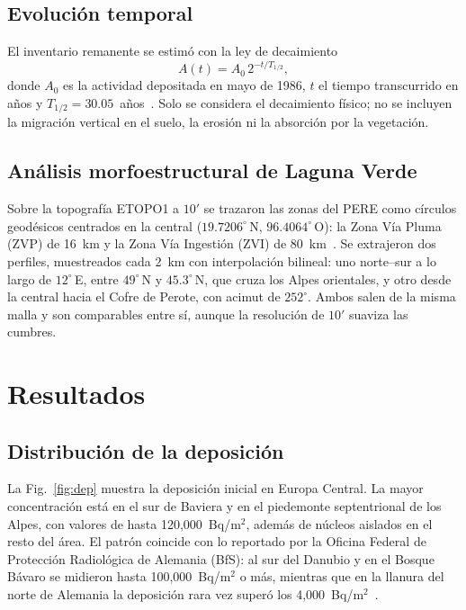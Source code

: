 \subsection{Evoluci\'on temporal}
El inventario remanente se estim\'o con la ley de decaimiento
\begin{equation}
A(t)=A_0\,2^{-t/T_{1/2}},
\label{eq:decay}
\end{equation}
donde $A_0$ es la actividad depositada en mayo de 1986, $t$ el tiempo transcurrido en a\~nos y $T_{1/2}=30.05$~a\~nos~\cite{pearce2008}. Solo se considera el decaimiento f\'isico; no se incluyen la migraci\'on vertical en el suelo, la erosi\'on ni la absorci\'on por la vegetaci\'on.

\subsection{An\'alisis morfoestructural de Laguna Verde}
Sobre la topograf\'ia ETOPO1 a $10'$ se trazaron las zonas del PERE como c\'irculos geod\'esicos centrados en la central ($19.7206^\circ$\,N, $96.4064^\circ$\,O): la Zona V\'ia Pluma (ZVP) de 16~km y la Zona V\'ia Ingesti\'on (ZVI) de 80~km~\cite{pere2011}. Se extrajeron dos perfiles, muestreados cada 2~km con interpolaci\'on bilineal: uno norte--sur a lo largo de $12^\circ$\,E, entre $49^\circ$\,N y $45.3^\circ$\,N, que cruza los Alpes orientales, y otro desde la central hacia el Cofre de Perote, con acimut de $252^\circ$. Ambos salen de la misma malla y son comparables entre s\'i, aunque la resoluci\'on de $10'$ suaviza las cumbres.

\section{Resultados}
\subsection{Distribuci\'on de la deposici\'on}
La Fig.~\ref{fig:dep} muestra la deposici\'on inicial en Europa Central. La mayor concentraci\'on est\'a en el sur de Baviera y en el piedemonte septentrional de los Alpes, con valores de hasta 120,000~Bq/m$^2$, adem\'as de n\'ucleos aislados en el resto del \'area. El patr\'on coincide con lo reportado por la Oficina Federal de Protecci\'on Radiol\'ogica de Alemania (BfS): al sur del Danubio y en el Bosque B\'avaro se midieron hasta 100,000~Bq/m$^2$ o m\'as, mientras que en la llanura del norte de Alemania la deposici\'on rara vez super\'o los 4,000~Bq/m$^2$~\cite{bfs2026}.

